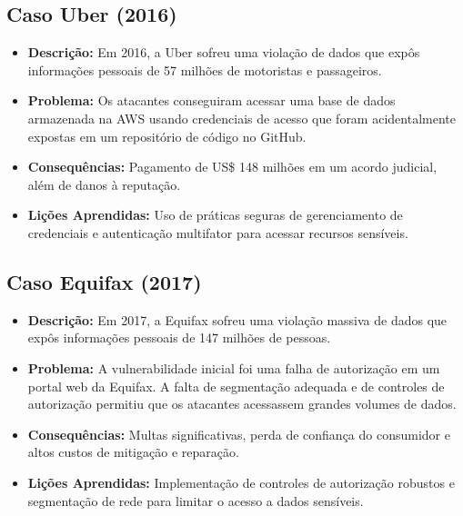 \documentclass{scrartcl}
\begin{document}
\subsection{Caso Uber (2016)}
\label{sec:org833ffe5}
\begin{itemize}
\item \textbf{\textbf{Descrição:}} Em 2016, a Uber sofreu uma violação de dados que expôs
informações pessoais de 57 milhões de motoristas e passageiros.
\item \textbf{\textbf{Problema:}} Os atacantes conseguiram acessar uma base de dados armazenada na
AWS usando credenciais de acesso que foram acidentalmente expostas em um
repositório de código no GitHub.
\item \textbf{\textbf{Consequências:}} Pagamento de US\$ 148 milhões em um acordo judicial, além de
danos à reputação.
\item \textbf{\textbf{Lições Aprendidas:}} Uso de práticas seguras de gerenciamento de credenciais
e autenticação multifator para acessar recursos sensíveis.
\end{itemize}

\subsection{Caso Equifax (2017)}
\label{sec:org2b61d3d}
\begin{itemize}
\item \textbf{\textbf{Descrição:}} Em 2017, a Equifax sofreu uma violação massiva de dados que
expôs informações pessoais de 147 milhões de pessoas.
\item \textbf{\textbf{Problema:}} A vulnerabilidade inicial foi uma falha de autorização em um
portal web da Equifax. A falta de segmentação adequada e de controles de
autorização permitiu que os atacantes acessassem grandes volumes de dados.
\item \textbf{\textbf{Consequências:}} Multas significativas, perda de confiança do consumidor e
altos custos de mitigação e reparação.
\item \textbf{\textbf{Lições Aprendidas:}} Implementação de controles de autorização robustos e
segmentação de rede para limitar o acesso a dados sensíveis.
\end{itemize}
\end{document}
